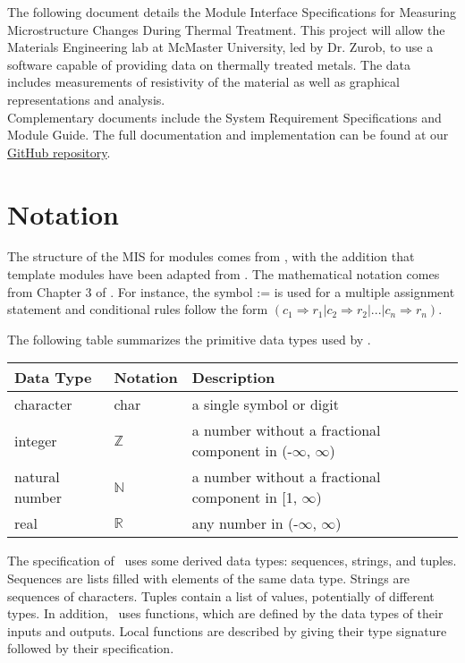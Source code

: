 \documentclass[12pt, titlepage]{article}
\begin{document}
\noindent The following document details the Module Interface Specifications for Measuring Microstructure Changes During Thermal Treatment. This project will allow the Materials Engineering lab at McMaster University, led by Dr. Zurob, to use a software capable of providing data on thermally treated metals. The data includes measurements of resistivity of the material as well as graphical representations and analysis. \\

\noindent Complementary documents include the System Requirement Specifications and Module Guide. The full documentation and implementation can be found at our \href{https://github.com/edwin-do/capstoneTeam30}{GitHub repository}.

\section{Notation}

The structure of the MIS for modules comes from \citet{HoffmanAndStrooper1995},
with the addition that template modules have been adapted from
\cite{GhezziEtAl2003}.  The mathematical notation comes from Chapter 3 of
\citet{HoffmanAndStrooper1995}.  For instance, the symbol := is used for a
multiple assignment statement and conditional rules follow the form $(c_1
\Rightarrow r_1 | c_2 \Rightarrow r_2 | ... | c_n \Rightarrow r_n )$.

The following table summarizes the primitive data types used by \progname. 

\begin{center}
\renewcommand{\arraystretch}{1.2}
\noindent 
\begin{tabular}{l l p{7.5cm}} 
\toprule 
\textbf{Data Type} & \textbf{Notation} & \textbf{Description}\\ 
\midrule
character & char & a single symbol or digit\\
integer & $\mathbb{Z}$ & a number without a fractional component in (-$\infty$, $\infty$) \\
natural number & $\mathbb{N}$ & a number without a fractional component in [1, $\infty$) \\
real & $\mathbb{R}$ & any number in (-$\infty$, $\infty$)\\
\bottomrule
\end{tabular} 
\end{center}

\noindent
The specification of \progname \ uses some derived data types: sequences, strings, and
tuples. Sequences are lists filled with elements of the same data type. Strings
are sequences of characters. Tuples contain a list of values, potentially of
different types. In addition, \progname \ uses functions, which
are defined by the data types of their inputs and outputs. Local functions are
described by giving their type signature followed by their specification.
\end{document}
